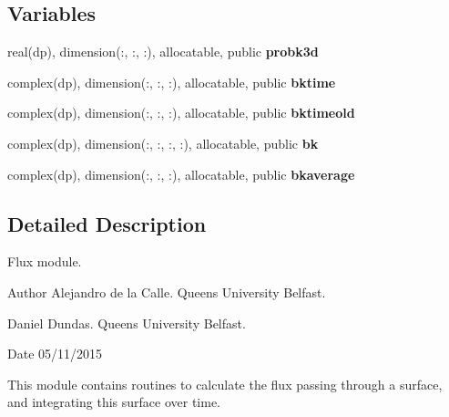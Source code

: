 \subsection*{Variables}
\begin{DoxyCompactItemize}
\item 
\mbox{\label{namespaceflux_a75c9cdf1cea8e80ebfef2eeab56cae63}} 
real(dp), dimension(\+:, \+:, \+:), allocatable, public {\bfseries probk3d}
\item 
\mbox{\label{namespaceflux_a31c2f93e11d855c35e8c79e95e385c3e}} 
complex(dp), dimension(\+:, \+:, \+:), allocatable, public {\bfseries bktime}
\item 
\mbox{\label{namespaceflux_a4e49591385063c1947b39e62425f9d59}} 
complex(dp), dimension(\+:, \+:, \+:), allocatable, public {\bfseries bktimeold}
\item 
\mbox{\label{namespaceflux_a4838ad043e62e7922f5f1e25964a3148}} 
complex(dp), dimension(\+:, \+:, \+:, \+:), allocatable, public {\bfseries bk}
\item 
\mbox{\label{namespaceflux_ac343e5ae6fb0b101196a1c11b5610677}} 
complex(dp), dimension(\+:, \+:, \+:), allocatable, public {\bfseries bkaverage}
\end{DoxyCompactItemize}


\subsection{Detailed Description}
Flux module. 

\begin{DoxyAuthor}{Author}
Alejandro de la Calle. Queen\textquotesingle{}s University Belfast. 

Daniel Dundas. Queen\textquotesingle{}s University Belfast. 
\end{DoxyAuthor}
\begin{DoxyDate}{Date}
05/11/2015
\end{DoxyDate}
This module contains routines to calculate the flux passing through a surface, and integrating this surface over time. 